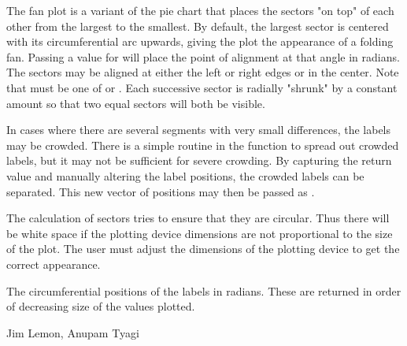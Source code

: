 \begin{Details}\relax
The fan plot is a variant of the pie chart that places the sectors
"on top" of each other from the largest to the smallest. By default,
the largest sector is centered with its circumferential arc upwards,
giving the plot the appearance of a folding fan. Passing a value for
 will place the point of alignment at that angle in 
radians. The sectors may be aligned at either the left or right edges
or in the center. Note that  must be one of 
or . Each successive sector is radially "shrunk" by a
constant amount so that two equal sectors will both be visible.

In cases where there are several segments with very small differences,
the labels may be crowded. There is a simple routine in the function to
spread out crowded labels, but it may not be sufficient for severe
crowding. By capturing the return value and manually altering 
the label positions, the crowded labels can be separated. This new
vector of positions may then be passed as .

The calculation of sectors tries to ensure that they are circular. Thus there
will be white space if the plotting device dimensions are not proportional to
the size of the plot. The user must adjust the dimensions of the plotting
device to get the correct appearance.
\end{Details}
\begin{Value}
The circumferential positions of the labels in radians. These are
returned in order of decreasing size of the values plotted.
\end{Value}
\begin{Author}\relax
Jim Lemon, Anupam Tyagi
\end{Author}
\begin{SeeAlso}\relax
{}
\end{SeeAlso}
\begin{Examples}
\end{Examples}

